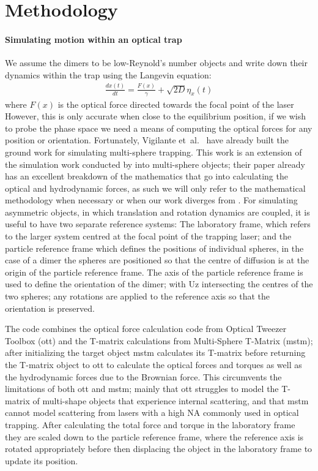 \documentclass[preprint,  3p]{elsarticle}
\begin{document}
\section{Methodology}

\paragraph{Simulating motion within an optical trap}
We assume the dimers to be low-Reynold’s number objects and write down their dynamics within the trap using the Langevin equation:
\begin{align}
\label{eq:langevin}
\frac{dx(t)}{dt}=\frac{F(x)}{\gamma}+\sqrt{2D}\eta_x(t)
\end{align}
where $F(x)$ is the optical force directed towards the focal point of the laser However, this is only accurate when close to the equilibrium position, if we wish to probe the phase space we need a means of computing the optical forces for any position or orientation. Fortunately, Vigilante et~al.\ \cite{Vigilante_2020} have already built the ground work for simulating multi-sphere trapping. This work is an extension of the simulation work conducted by \cite{Vigilante_2020} into multi-sphere objects; their paper already has an excellent breakdown of the mathematics that go into calculating the optical and hydrodynamic forces, as such we will only refer to the mathematical methodology when necessary or when our work diverges from \cite{Vigilante_2020}. For simulating asymmetric objects, in which translation and rotation dynamics are coupled, it is useful to have two separate reference systems: The laboratory frame, which refers to the larger system centred at the focal point of the trapping laser; and the particle reference frame which defines the positions of individual spheres, in the case of a dimer the spheres are positioned so that the centre of diffusion is at the origin of the particle reference frame. The axis of the particle reference frame is used to define the orientation of the dimer; with Uz intersecting the centres of the two spheres; any rotations are applied to the reference axis so that the orientation is preserved.

The code combines the optical force calculation code from Optical Tweezer Toolbox (ott) and the T-matrix calculations from Multi-Sphere T-Matrix (mstm); after initializing the target object mstm calculates its T-matrix before returning the T-matrix object to ott to calculate the optical forces and torques as well as the hydrodynamic forces due to the Brownian force. This circumvents the limitations of both ott and mstm; mainly that ott struggles to model the T-matrix of multi-shape objects that experience internal scattering, and that mstm cannot model scattering from lasers with a high NA commonly used in optical trapping. After calculating the total force and torque in the laboratory frame they are scaled down to the particle reference frame, where the reference axis is rotated appropriately before then displacing the object in the laboratory frame to update its position.  
\end{document}
